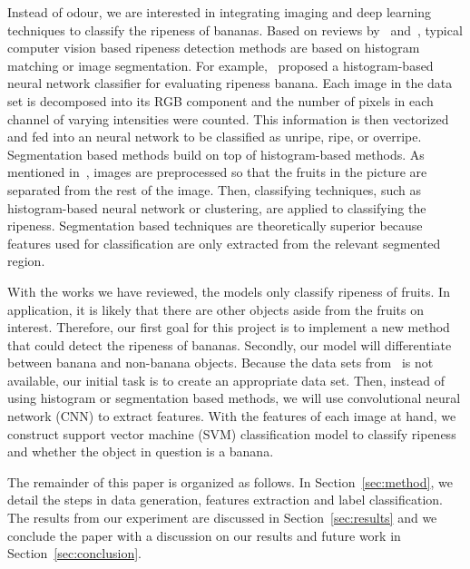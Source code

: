 \documentclass{article} %
\begin{document}
Instead of odour, we are interested in integrating imaging and deep learning techniques to classify the ripeness of bananas. Based on reviews by~\citet{dadwal2012color} and~\citet{kodagali2012computer}, typical computer vision based ripeness detection methods are based on histogram matching or image segmentation. For example,~\citet{paulraj2009color} proposed a histogram-based neural network classifier for evaluating ripeness banana. Each image in the data set is decomposed into its RGB component and the number of pixels in each channel of varying intensities were counted. This information is then vectorized and fed into an neural network to be classified as unripe, ripe, or overripe. Segmentation based methods build on top of histogram-based methods. As mentioned in~\citet{dadwal2012color}, images are preprocessed so that the fruits in the picture are separated from the rest of the image. Then, classifying techniques, such as histogram-based neural network or clustering, are applied to classifying the ripeness. Segmentation based techniques are theoretically superior because features used for classification are only extracted from the relevant segmented region. 

With the works we have reviewed, the models only classify ripeness of fruits. In application, it is likely that there are other objects aside from the fruits on interest. Therefore, our first goal for this project is to implement a new method that could detect the ripeness of bananas. Secondly, our model will differentiate between banana and non-banana objects. Because the data sets from~\citet{paulraj2009color} is not available, our initial task is to create an appropriate data set. Then, instead of using histogram or segmentation based methods, we will use convolutional neural network (CNN) to extract features. With the features of each image at hand, we construct support vector machine (SVM) classification model to classify ripeness and whether the object in question is a banana. 

The remainder of this paper is organized as follows. In Section~\ref{sec:method}, we detail the steps in data generation, features extraction and label classification. The results from our experiment are discussed in Section~\ref{sec:results} and we conclude the paper with a discussion on our results and future work in Section~\ref{sec:conclusion}. 

\end{document}
